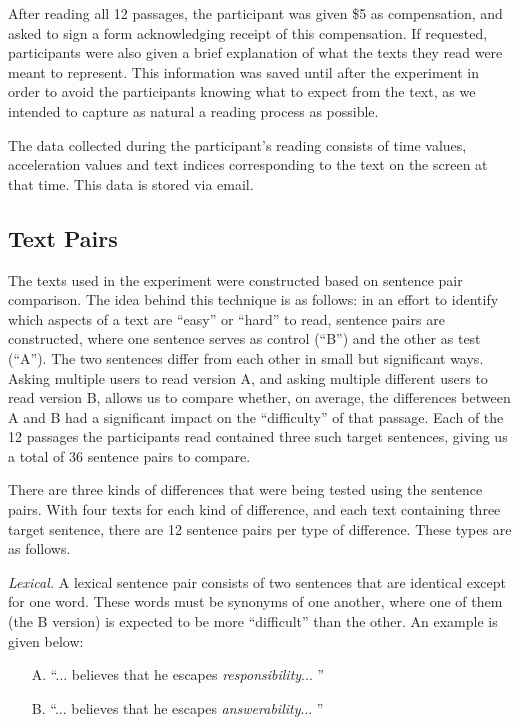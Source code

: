 \documentclass[11pt,letterpaper]{article}
\begin{document}
After reading all 12 passages, the participant was given \$5 as compensation, and asked to sign a form acknowledging receipt of this compensation. If requested, participants were also given a brief explanation of what the texts they read were meant to represent. This information was saved until after the experiment in order to avoid the participants knowing what to expect from the text, as we intended to capture as natural a reading process as possible.

The data collected during the participant's reading consists of time values, acceleration values and text indices corresponding to the text on the screen at that time. This data is stored via email.

\subsection{Text Pairs}

The texts used in the experiment were constructed based on sentence pair comparison. The idea behind this technique is as follows: in an effort to identify which aspects of a text are ``easy'' or ``hard'' to read, sentence pairs are constructed, where one sentence serves as control (``B'') and the other as test (``A''). The two sentences differ from each other in small but significant ways. Asking multiple users to read version A, and asking multiple different users to read version B, allows us to compare whether, on average, the differences between A and B had a significant impact on the ``difficulty'' of that passage. Each of the 12 passages the participants read contained three such target sentences, giving us a total of 36 sentence pairs to compare.

There are three kinds of differences that were being tested using the sentence pairs. With four texts for each kind of difference, and each text containing three target sentence, there are 12 sentence pairs per type of difference. These types are as follows.

\textit{Lexical.} A lexical sentence pair consists of two sentences that are identical except for one word. These words must be synonyms of one another, where one of them (the B version) is expected to be more ``difficult'' than the other. An example is given below:
\begin{itemize}[noitemsep, nolistsep]
\item[A.] ``... believes that he escapes \textit{responsibility}... ''
\item[B.] ``... believes that he escapes \textit{answerability}... ''
\end{itemize}
\end{document}
